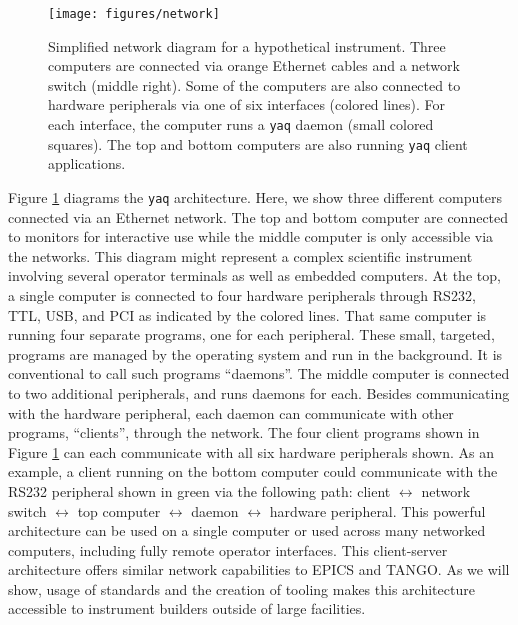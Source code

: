 \documentclass[aip, amsmath, amssymb, reprint,]{revtex4-2}
\newcommand\yaq{\texttt{yaq}}
\begin{document}
\begin{figure}
    \texttt{[image: figures/network]}
    \caption{\label{fig:network} Simplified network diagram for a hypothetical instrument. Three computers are connected via orange Ethernet cables and a network switch (middle right). Some of the computers are also connected to hardware peripherals via one of six interfaces (colored lines). For each interface, the computer runs a \yaq{} daemon (small colored squares). The top and bottom computers are also running \yaq{} client applications.}
\end{figure}

Figure \ref{fig:network} diagrams the \yaq{} architecture.
Here, we show three different computers connected via an Ethernet network.
The top and bottom computer are connected to monitors for interactive use while the middle computer is only accessible via the networks.
This diagram might represent a complex scientific instrument involving several operator terminals as well as embedded computers.
At the top, a single computer is connected to four hardware peripherals through RS232, TTL, USB, and PCI as indicated by the colored lines.
That same computer is running four separate programs, one for each peripheral.
These small, targeted, programs are managed by the operating system and run in the background.
It is conventional to call such programs ``daemons''\cite{Raymond_1996}.
The middle computer is connected to two additional peripherals, and runs daemons for each.
Besides communicating with the hardware peripheral, each daemon can communicate with other programs, ``clients'',  through the network.
The four client programs shown in Figure \ref{fig:network} can each communicate with all six hardware peripherals shown.
As an example, a client running on the bottom computer could communicate with the RS232 peripheral shown in green via the following path: client $\leftrightarrow$ network switch $\leftrightarrow$ top computer $\leftrightarrow$ daemon $\leftrightarrow$ hardware peripheral.
This powerful architecture can be used on a single computer or used across many networked computers, including fully remote operator interfaces.
This client-server architecture offers similar network capabilities to EPICS and TANGO.
As we will show, usage of standards and the creation of tooling makes this architecture accessible to instrument builders outside of large facilities.
\end{document}
